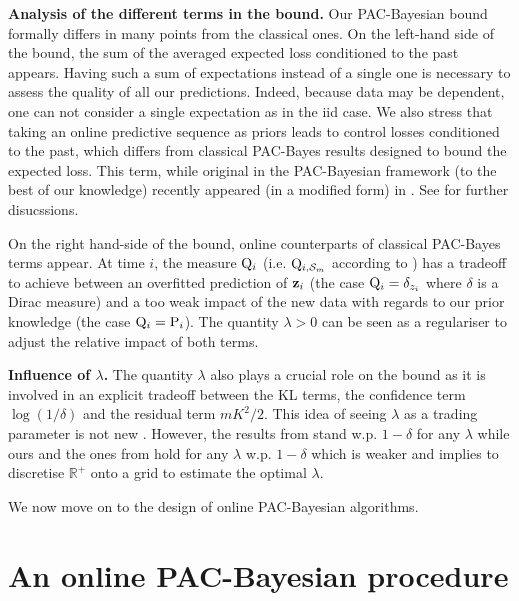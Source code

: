 \textbf{Analysis of the different terms in the bound.}
Our PAC-Bayesian bound formally differs in many points from the classical ones.
  On the left-hand side of the bound, the sum of the averaged expected loss conditioned to the past appears. Having such a sum of expectations instead of a single one is necessary to assess the quality of all our predictions. Indeed, because data may be dependent, one can not consider a single expectation as in the iid case. We also stress that taking an online predictive sequence as priors leads to control losses conditioned to the past, which differs from classical PAC-Bayes results designed to bound the expected loss. This term, while original in the PAC-Bayesian framework (to the best of our knowledge) recently appeared (in a modified form) in \citet[Prop 3]{wintenberger2021stochastic}. See  for further disucssions.

  On the right hand-side of the bound, online counterparts of classical PAC-Bayes terms appear. At time $i$, the measure $\mathrm{Q}_{i}$ (i.e. $\mathrm{Q}_{i,\mathcal{S}_m}$ according to ) has a tradeoff to achieve between an overfitted prediction of $\mathbf{z}_i$ (the case $\mathrm{Q}_{i}=\delta_{z_i}$ where $\delta$ is a Dirac measure) and a too weak impact of the new data with regards to our prior knowledge (the case $\mathrm{Q}_{i}=\mathrm{P}_{i}$). The quantity $\lambda>0$ can be seen as a regulariser to adjust the relative impact of both terms.


\textbf{Influence of $\lambda$.}
The quantity $\lambda$ also plays a crucial role on the bound as it is involved in an explicit tradeoff between the KL terms, the confidence term $\log(1/\delta)$ and the residual term $mK^2/2$. This idea of seeing $\lambda$ as a trading parameter is not new \citep{thiemann2017strongly,germain2016pac}.
 However, the results from \citet{thiemann2017strongly} stand w.p. $1-\delta $ for any $\lambda$ while ours and the ones from \citet{germain2016pac} hold for any $\lambda$ w.p. $1-\delta$ which is weaker and implies to discretise $\mathbb{R}^+$ onto a grid to estimate the optimal $\lambda$.

We now move on to the design of online PAC-Bayesian algorithms.


\section{An online PAC-Bayesian procedure}

\label{sec: online_pacb_procedure}

